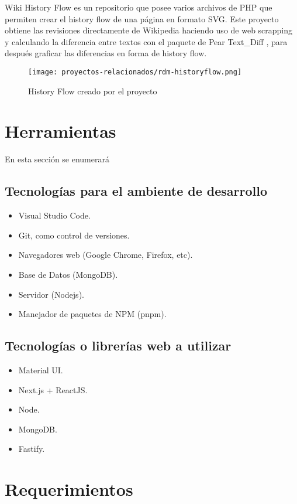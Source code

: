 Wiki History Flow es un repositorio que posee varios archivos de PHP que permiten crear el history flow de una página en formato SVG. Este proyecto obtiene las revisiones directamente de Wikipedia haciendo uso de web scrapping y calculando la diferencia entre textos con el paquete de Pear Text\_Diff \cite{pear_text_diff}, para después graficar las diferencias en forma de history flow.

\begin{figure}[H]
    \centering
    \texttt{[image: proyectos-relacionados/rdm-historyflow.png]}
    \caption{History Flow creado por el proyecto}
    \label{fig:rdm-historyflow}
\end{figure}


\section{Herramientas}
En esta sección se enumerará 

\subsection{Tecnologías para el ambiente de desarrollo}
\begin{itemize}
    \item Visual Studio Code.
    \item Git, como control de versiones.
    \item Navegadores web (Google Chrome, Firefox, etc).
    \item Base de Datos (MongoDB).
    \item Servidor (Nodejs).
    \item Manejador de paquetes de NPM (pnpm).
\end{itemize}

\subsection{Tecnologías o librerías web a utilizar}
\begin{itemize}
    \item Material UI.
    \item Next.js + ReactJS.
    \item Node.
    \item MongoDB.
    \item Fastify.
\end{itemize}

\section{Requerimientos}

